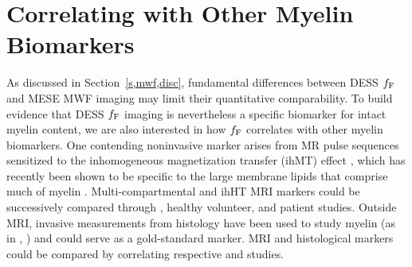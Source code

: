 \section{Correlating with Other Myelin Biomarkers}
\label{s,future,myelin}

As discussed in Section~\ref{s,mwf,disc},
fundamental differences 
between DESS $f_{\mathrm{F}}$ and MESE MWF imaging
may limit their quantitative comparability.
To build evidence 
that DESS $f_{\mathrm{F}}$ imaging
is nevertheless a specific biomarker
for intact myelin content,
we are also interested 
in how $f_{\mathrm{F}}$ correlates 
with other myelin biomarkers.
One contending noninvasive marker arises
from MR pulse sequences sensitized
to the inhomogeneous magnetization transfer (ihMT) effect
\cite{varma:15:mtf},
which has recently been shown
to be specific
to the large membrane lipids
that comprise much of myelin
\cite{varma:15:iom, swanson:17:mda}.
Multi-compartmental and ihHT MRI markers 
could be successively compared 
through \exvivo, healthy volunteer, and patient studies.
Outside MRI,
invasive measurements
from histology
have been used to study myelin 
(as in \eg, \cite{gareau:00:mta, webb:03:imt})
and could serve as a gold-standard \insitu marker.
MRI and histological markers
could be compared 
by correlating respective \exvivo and \insitu studies.
